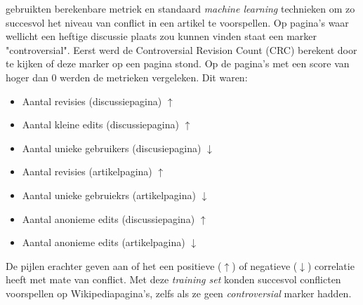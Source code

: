 \citet{kittur2007he} gebruikten berekenbare metriek en standaard \textit{machine learning} technieken om zo succesvol het niveau van conflict in een artikel te voorspellen. Op pagina's waar wellicht een heftige discussie plaats zou kunnen vinden staat een marker "{{controversial}}". Eerst werd de Controversial Revision Count (CRC) berekent door te kijken of deze marker op een pagina stond. Op de pagina's met een score van hoger dan 0 werden de metrieken vergeleken. Dit waren:

\begin{itemize}
\item Aantal revisies (discussiepagina) $\uparrow$
\item Aantal kleine edits (discussiepagina) $\uparrow$
\item Aantal unieke gebruikers (discusiepagina) $\downarrow$
\item Aantal revisies (artikelpagina) $\uparrow$
\item Aantal unieke gebruiekrs (artikelpagina) $\downarrow$
\item Aantal anonieme edits (discussiepagina) $\uparrow$
\item Aantal anonieme edits (artikelpagina) $\downarrow$
\end{itemize}

De pijlen erachter geven aan of het een positieve ($\uparrow$) of negatieve ($\downarrow$) correlatie heeft met mate van conflict. Met deze \textit{training set} konden \citet{kittur2007he} succesvol conflicten voorspellen op Wikipediapagina's, zelfs als ze geen \textit{controversial} marker hadden.




